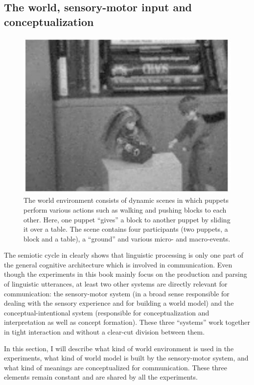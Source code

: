 \subsection{The world, sensory-motor input and conceptualization}
\label{s:world}

\begin{figure}[t]
\centerline{\includegraphics[width=0.65\linewidth]{Chapter3/figs/puppets}}
  \caption[An example scene]{The world environment consists of dynamic scenes in which puppets perform various actions such as walking and pushing blocks to each other. Here, one puppet ``gives'' a block to another puppet by sliding it over a table. The scene contains four participants (two puppets, a block and a table), a ``ground'' and various micro- and macro-events.}
   \label{f:puppets}
\end{figure}

The semiotic cycle in  clearly shows that linguistic processing is only one part of the general cognitive architecture which is involved in communication. Even though the experiments in this book mainly focus on the production and parsing of linguistic utterances, at least two other systems are directly relevant for communication: the sensory-motor system (in a broad sense responsible for dealing with the sensory experience and for building a world model) and the conceptual-intentional system (responsible for conceptualization and interpretation as well as concept formation). These three ``systems'' work together in tight interaction and without a clear-cut division between them.

In this section, I will describe what kind of world environment is used in the experiments, what kind of world model is built by the sensory-motor system, and what kind of meanings are conceptualized for communication. These three elements remain constant and are shared by all the experiments.


